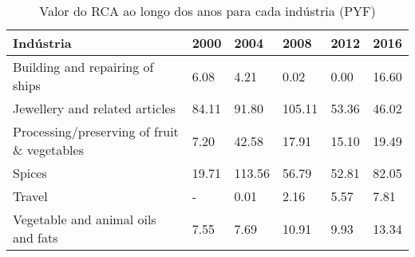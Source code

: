 \begin{table}
\centering
\caption{Valor do RCA ao longo dos anos para cada indústria (PYF)}
\begin{tabular}{p{6cm}p{1.5cm}p{1.5cm}p{1.5cm}p{1.5cm}p{1.5cm}}
\toprule
                                  Indústria &  2000 &   2004 &   2008 &  2012 &  2016 \\
\midrule
            Building and repairing of ships &  6.08 &   4.21 &   0.02 &  0.00 & 16.60 \\
             Jewellery and related articles & 84.11 &  91.80 & 105.11 & 53.36 & 46.02 \\
Processing/preserving of fruit \& vegetables &  7.20 &  42.58 &  17.91 & 15.10 & 19.49 \\
                                     Spices & 19.71 & 113.56 &  56.79 & 52.81 & 82.05 \\
                                     Travel &     - &   0.01 &   2.16 &  5.57 &  7.81 \\
         Vegetable and animal oils and fats &  7.55 &   7.69 &  10.91 &  9.93 & 13.34 \\
\bottomrule
\end{tabular}
\end{table}
